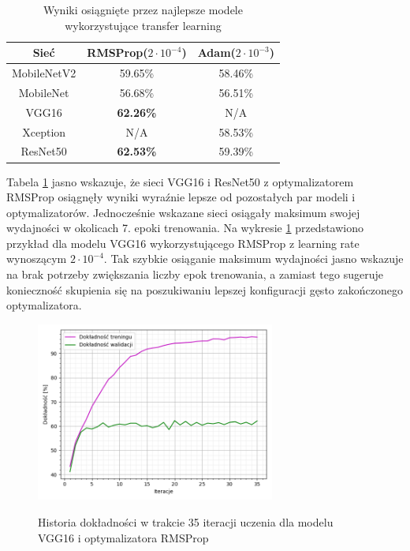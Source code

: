 \begin{table}[H]
  \centering
  \caption{Wyniki osiągnięte przez najlepsze modele wykorzystujące transfer learning}
    \begin{tabular}{ |c|c|c| }
    \hline
    Sieć & RMSProp($2\cdot10^{-4}$) & Adam($2\cdot10^{-3}$) \\
    \hline
    MobileNetV2 & 59.65\% & 58.46\% \\ 
    MobileNet & 56.68\% & 56.51\% \\ 
    VGG16 & \textbf{62.26\%} & N/A \\
    Xception & N/A & 58.53\% \\ 
    ResNet50 & \textbf{62.53\%} & 59.39\% \\ 
    \hline
    \end{tabular}
  \label{tab:5.13}
\end{table}

Tabela \ref{tab:5.13} jasno wskazuje, że sieci VGG16 i ResNet50 z optymalizatorem RMSProp osiągnęły wyniki wyraźnie lepsze od pozostałych par modeli i optymalizatorów. Jednocześnie wskazane sieci osiągały maksimum swojej wydajności w okolicach 7. epoki trenowania. Na wykresie \ref{pic:5.6} przedstawiono przykład dla modelu VGG16 wykorzystującego RMSProp z learning rate wynoszącym $2\cdot10^{-4}$. Tak szybkie osiąganie maksimum wydajności jasno wskazuje na brak potrzeby zwiększania liczby epok trenowania, a zamiast tego sugeruje konieczność skupienia się na poszukiwaniu lepszej konfiguracji gęsto zakończonego optymalizatora.

\begin{figure}[H]
    \caption{Historia dokładności w trakcie 35 iteracji uczenia dla modelu VGG16 i optymalizatora RMSProp}
    \centering
    \includegraphics[width=0.7\textwidth]{wykres6.png}
    \label{pic:5.6}
\end{figure}

